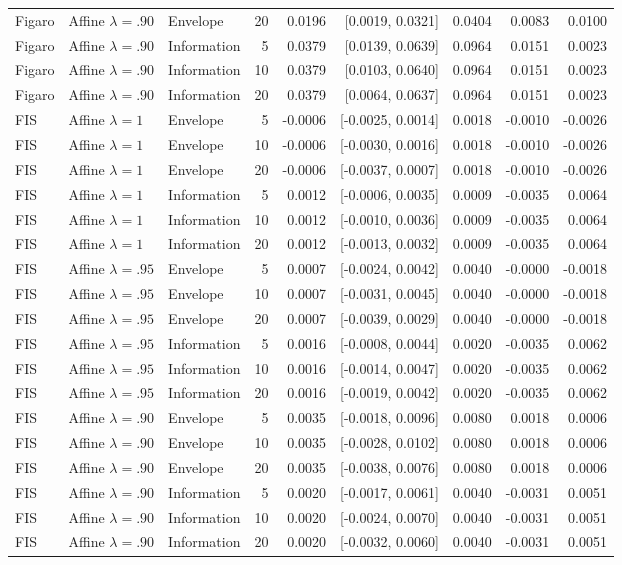 \begin{longtable}{lllrrrrrr}
Figaro & Affine $\lambda=.90$ & Envelope & 20 & 0.0196 & [0.0019, 0.0321] & 0.0404 & 0.0083 & 0.0100 \\
Figaro & Affine $\lambda=.90$ & Information & 5 & 0.0379 & [0.0139, 0.0639] & 0.0964 & 0.0151 & 0.0023 \\
Figaro & Affine $\lambda=.90$ & Information & 10 & 0.0379 & [0.0103, 0.0640] & 0.0964 & 0.0151 & 0.0023 \\
Figaro & Affine $\lambda=.90$ & Information & 20 & 0.0379 & [0.0064, 0.0637] & 0.0964 & 0.0151 & 0.0023 \\
FIS & Affine $\lambda=1$ & Envelope & 5 & -0.0006 & [-0.0025, 0.0014] & 0.0018 & -0.0010 & -0.0026 \\
FIS & Affine $\lambda=1$ & Envelope & 10 & -0.0006 & [-0.0030, 0.0016] & 0.0018 & -0.0010 & -0.0026 \\
FIS & Affine $\lambda=1$ & Envelope & 20 & -0.0006 & [-0.0037, 0.0007] & 0.0018 & -0.0010 & -0.0026 \\
FIS & Affine $\lambda=1$ & Information & 5 & 0.0012 & [-0.0006, 0.0035] & 0.0009 & -0.0035 & 0.0064 \\
FIS & Affine $\lambda=1$ & Information & 10 & 0.0012 & [-0.0010, 0.0036] & 0.0009 & -0.0035 & 0.0064 \\
FIS & Affine $\lambda=1$ & Information & 20 & 0.0012 & [-0.0013, 0.0032] & 0.0009 & -0.0035 & 0.0064 \\
FIS & Affine $\lambda=.95$ & Envelope & 5 & 0.0007 & [-0.0024, 0.0042] & 0.0040 & -0.0000 & -0.0018 \\
FIS & Affine $\lambda=.95$ & Envelope & 10 & 0.0007 & [-0.0031, 0.0045] & 0.0040 & -0.0000 & -0.0018 \\
FIS & Affine $\lambda=.95$ & Envelope & 20 & 0.0007 & [-0.0039, 0.0029] & 0.0040 & -0.0000 & -0.0018 \\
FIS & Affine $\lambda=.95$ & Information & 5 & 0.0016 & [-0.0008, 0.0044] & 0.0020 & -0.0035 & 0.0062 \\
FIS & Affine $\lambda=.95$ & Information & 10 & 0.0016 & [-0.0014, 0.0047] & 0.0020 & -0.0035 & 0.0062 \\
FIS & Affine $\lambda=.95$ & Information & 20 & 0.0016 & [-0.0019, 0.0042] & 0.0020 & -0.0035 & 0.0062 \\
FIS & Affine $\lambda=.90$ & Envelope & 5 & 0.0035 & [-0.0018, 0.0096] & 0.0080 & 0.0018 & 0.0006 \\
FIS & Affine $\lambda=.90$ & Envelope & 10 & 0.0035 & [-0.0028, 0.0102] & 0.0080 & 0.0018 & 0.0006 \\
FIS & Affine $\lambda=.90$ & Envelope & 20 & 0.0035 & [-0.0038, 0.0076] & 0.0080 & 0.0018 & 0.0006 \\
FIS & Affine $\lambda=.90$ & Information & 5 & 0.0020 & [-0.0017, 0.0061] & 0.0040 & -0.0031 & 0.0051 \\
FIS & Affine $\lambda=.90$ & Information & 10 & 0.0020 & [-0.0024, 0.0070] & 0.0040 & -0.0031 & 0.0051 \\
FIS & Affine $\lambda=.90$ & Information & 20 & 0.0020 & [-0.0032, 0.0060] & 0.0040 & -0.0031 & 0.0051 \\
\end{longtable}\normalsize
